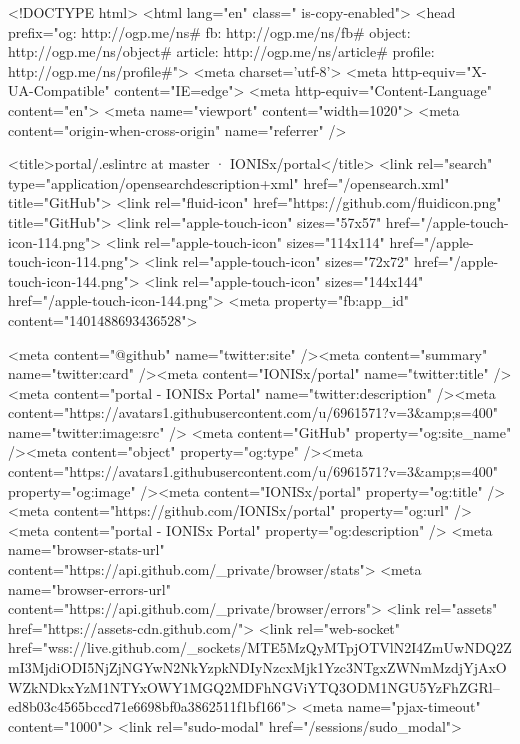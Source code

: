 



<!DOCTYPE html>
<html lang="en" class=" is-copy-enabled">
  <head prefix="og: http://ogp.me/ns# fb: http://ogp.me/ns/fb# object: http://ogp.me/ns/object# article: http://ogp.me/ns/article# profile: http://ogp.me/ns/profile#">
    <meta charset='utf-8'>
    <meta http-equiv="X-UA-Compatible" content="IE=edge">
    <meta http-equiv="Content-Language" content="en">
    <meta name="viewport" content="width=1020">
    <meta content="origin-when-cross-origin" name="referrer" />
    
    <title>portal/.eslintrc at master · IONISx/portal</title>
    <link rel="search" type="application/opensearchdescription+xml" href="/opensearch.xml" title="GitHub">
    <link rel="fluid-icon" href="https://github.com/fluidicon.png" title="GitHub">
    <link rel="apple-touch-icon" sizes="57x57" href="/apple-touch-icon-114.png">
    <link rel="apple-touch-icon" sizes="114x114" href="/apple-touch-icon-114.png">
    <link rel="apple-touch-icon" sizes="72x72" href="/apple-touch-icon-144.png">
    <link rel="apple-touch-icon" sizes="144x144" href="/apple-touch-icon-144.png">
    <meta property="fb:app_id" content="1401488693436528">

      <meta content="@github" name="twitter:site" /><meta content="summary" name="twitter:card" /><meta content="IONISx/portal" name="twitter:title" /><meta content="portal - IONISx Portal" name="twitter:description" /><meta content="https://avatars1.githubusercontent.com/u/6961571?v=3&amp;s=400" name="twitter:image:src" />
      <meta content="GitHub" property="og:site_name" /><meta content="object" property="og:type" /><meta content="https://avatars1.githubusercontent.com/u/6961571?v=3&amp;s=400" property="og:image" /><meta content="IONISx/portal" property="og:title" /><meta content="https://github.com/IONISx/portal" property="og:url" /><meta content="portal - IONISx Portal" property="og:description" />
      <meta name="browser-stats-url" content="https://api.github.com/_private/browser/stats">
    <meta name="browser-errors-url" content="https://api.github.com/_private/browser/errors">
    <link rel="assets" href="https://assets-cdn.github.com/">
    <link rel="web-socket" href="wss://live.github.com/_sockets/MTE5MzQyMTpjOTVlN2I4ZmUwNDQ2ZmI3MjdiODI5NjZjNGYwN2NkYzpkNDIyNzcxMjk1Yzc3NTgxZWNmMzdjYjAxOWZkNDkxYzM1NTYxOWY1MGQ2MDFhNGViYTQ3ODM1NGU5YzFhZGRl--ed8b03c4565bccd71e6698bf0a3862511f1bf166">
    <meta name="pjax-timeout" content="1000">
    <link rel="sudo-modal" href="/sessions/sudo_modal">

